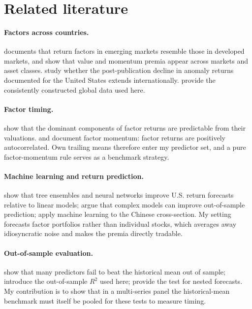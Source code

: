 \documentclass[11pt]{article}
\begin{document}
\section{Related literature}

\paragraph{Factors across countries.} \citet{rouwenhorst1999local} documents that return factors in emerging markets resemble those in developed markets, and \citet{asness2013value} show that value and momentum premia appear across markets and asset classes. \citet{jacobs2020anomalies} study whether the post-publication decline in anomaly returns documented for the United States extends internationally. \citet{jensen2023replication} provide the consistently constructed global data used here.

\paragraph{Factor timing.} \citet{haddad2020factor} show that the dominant components of factor returns are predictable from their valuations. \citet{gupta2019factor} and \citet{ehsani2022factor} document factor momentum: factor returns are positively autocorrelated. Own trailing means therefore enter my predictor set, and a pure factor-momentum rule serves as a benchmark strategy.

\paragraph{Machine learning and return prediction.} \citet{gu2020empirical} show that tree ensembles and neural networks improve U.S. return forecasts relative to linear models; \citet{kelly2024virtue} argue that complex models can improve out-of-sample prediction; \citet{leippold2022machine} apply machine learning to the Chinese cross-section. My setting forecasts factor portfolios rather than individual stocks, which averages away idiosyncratic noise and makes the premia directly tradable.

\paragraph{Out-of-sample evaluation.} \citet{welch2008comprehensive} show that many predictors fail to beat the historical mean out of sample; \citet{campbell2008predicting} introduce the out-of-sample $R^2$ used here; \citet{clark2007approximately} provide the test for nested forecasts. My contribution is to show that in a multi-series panel the historical-mean benchmark must itself be pooled for these tests to measure timing.
\end{document}

